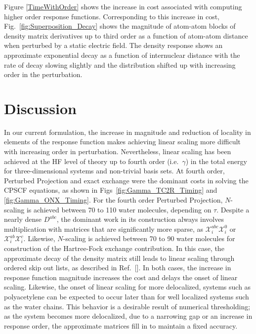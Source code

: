 \documentclass[prl,twocolumn,showpacs,twocolumngrid,superbib]{revtex4}
\def\X{\mathcal{X}}
\begin{document}
Figure \ref{TimeWithOrder} shows the increase in cost associated with computing  higher order response functions.
Corresponding to this increase in cost, Fig.~\ref{fig:Superposition_Decay} shows the magnitude of atom-atom blocks 
of density matrix derivatives up to third order as a function of atom-atom distance 
when perturbed by a static electric field.  The density response shows an approximate 
exponential decay as a function of internuclear distance with the rate of  decay
slowing slightly and the distribution shifted up with increasing order in the perturbation.

\section{Discussion}

In our current formulation, the increase in magnitude and reduction of locality in elements of the 
response function makes achieving linear scaling more difficult with increasing order in perturbation. 
Nevertheless, linear scaling has been achieved at the HF level of theory up to fourth order (i.e.~$\gamma$) 
in the total energy for three-dimensional systems and  non-trivial basis sets.  At fourth order,
Perturbed Projection and exact exchange were the dominant costs in solving the CPSCF equations,
as shown in Figs~\ref{fig:Gamma_TC2R_Timing} and \ref{fig:Gamma_ONX_Timing}.  For the fourth order Perturbed Projection, 
$N$-scaling is achieved 
between 70 to 110 water molecules, depending on $\tau$.  Despite a nearly dense $D^{abc}$, the 
dominant work in its construction always involves multiplication with matrices that are significantly 
more sparse, as $\X^{abc}_i\X^{0}_i$ or $\X^{ab}_i\X^{c}_i$.   Likewise, $N$-scaling is achieved between 
70 to 90 water molecules for construction of the Hartree-Fock exchange contribution.  In this case, 
the approximate decay of the density matrix still leads to linear scaling through ordered skip out lists,
as described in Ref.~[].  In both cases, the increase in response function magnitude
increases the cost and delays the onset of linear scaling.   Likewise, the onset of linear scaling for more  
delocalized, systems such as polyacetylene can be expected to occur later than for well localized systems such 
as the water chains.  This behavior is a desirable result of numerical thresholding;  as the system becomes more 
delocalized, due to a narrowing gap or an increase in response order, the approximate matrices fill in to 
maintain a fixed accuracy\cite{ANiklasson03}.  
\end{document}
